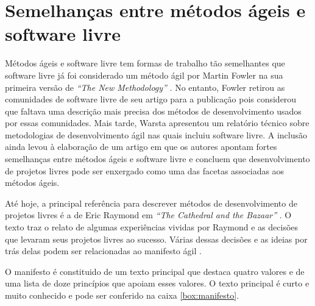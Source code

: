 \chapter{Semelhanças entre métodos ágeis e software livre}
\label{cap:semelhancas}

Métodos ágeis e software livre tem formas de trabalho tão semelhantes
que software livre já foi considerado um método ágil por Martin Fowler
na sua primeira versão de \emph{``The New Methodology''}
\cite{Fowler00orig}. No entanto, Fowler retirou as comunidades de
software livre de seu artigo para a publicação pois considerou que
faltava uma descrição mais precisa dos métodos de desenvolvimento
usados por essas comunidades. Mais tarde, Warsta \cite{Warsta2002}
apresentou um relatório técnico sobre metodologias de desenvolvimento
ágil nas quais incluiu software livre. A inclusão ainda levou à
elaboração de um artigo \cite{Warsta2003} em que os autores apontam
fortes semelhanças entre métodos ágeis e software livre e concluem que
desenvolvimento de projetos livres pode ser enxergado como uma das
facetas associadas aos métodos ágeis.

Até hoje, a principal referência para descrever métodos de
desenvolvimento de projetos livres é a de Eric Raymond em \emph{``The
  Cathedral and the Bazaar''} \cite{Raymond1999}. O texto traz o
relato de algumas experiências vividas por Raymond e as decisões que
levaram seus projetos livres ao sucesso. Várias dessas decisões e as
ideias por trás delas podem ser relacionadas ao manifesto ágil
\cite{AgileManifesto}.

O manifesto é constituido de um texto principal que destaca quatro
valores e de uma lista de doze princípios que apoiam esses valores. O
texto principal é curto e muito conhecido e pode ser conferido na
caixa \ref{box:manifesto}.

